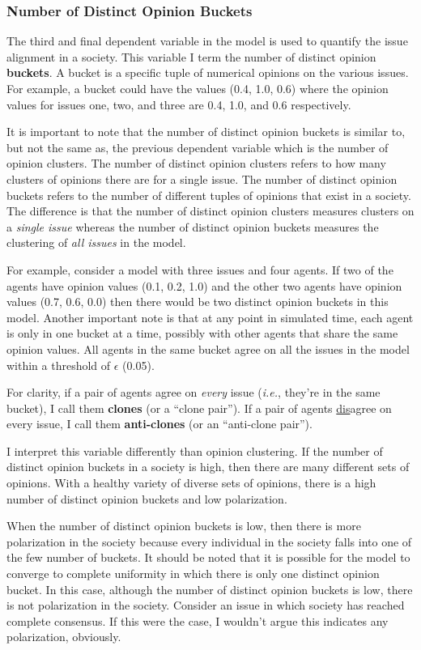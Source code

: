 \subsubsection{Number of Distinct Opinion Buckets}

The third and final dependent variable in the model is used to quantify the issue alignment in a society. This variable I term the number of distinct opinion \textbf{buckets}.
A bucket is a specific tuple of numerical opinions on the various issues. For example, a bucket could have the values (0.4, 1.0, 0.6) where the opinion values for issues one, two, and three are 0.4, 1.0, and 0.6 respectively. 

It is important to note that the number of distinct opinion buckets is similar to, but not the same as, the previous dependent variable which is the number of opinion clusters. The number of distinct opinion clusters refers to how many clusters of opinions there are for a single issue. The number of distinct opinion buckets refers to the number of different tuples of opinions that exist in a society. The difference is that the number of distinct opinion clusters measures clusters on a \textit{single issue} whereas the number of distinct opinion buckets measures the clustering of \textit{all issues} in the model.

For example, consider a model with three issues and four agents. If two of the agents have opinion values (0.1, 0.2, 1.0) and the other two agents have opinion values (0.7, 0.6, 0.0) then there would be two distinct opinion buckets in this model. Another important note is that at any point in simulated time, each agent is only in one bucket at a time, possibly with other agents that share the same opinion values. All agents in the same bucket agree on all the issues in the model within a threshold of $\epsilon$ (0.05). 

For clarity, if a pair of agents agree on \textit{every} issue (\textit{i.e.}, they're in the same bucket), I call them \textbf{clones} (or a ``clone pair''). If a pair of agents \underline{dis}agree on every issue, I call them \textbf{anti-clones} (or an ``anti-clone pair'').

I interpret this variable differently than opinion clustering. If the number of distinct opinion buckets in a society is high, then there are many different sets of opinions. With a healthy variety of diverse sets of opinions, there is a high number of distinct opinion buckets and low polarization. 

When the number of distinct opinion buckets is low, then there is more polarization in the society because every individual in the society falls into one of the few number of buckets. It should be noted that it is possible for the model to converge to complete uniformity in which there is only one distinct opinion bucket. In this case, although the number of distinct opinion buckets is low, there is not polarization in the society. Consider an issue in which society has reached complete consensus. If this were the case, I wouldn't argue this indicates any polarization, obviously.    